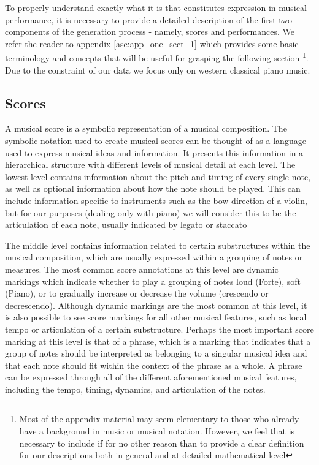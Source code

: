 To properly understand exactly what it is that constitutes expression in musical performance, it is necessary to provide a detailed description of the first two components of the generation process - namely, scores and performances. We refer the reader to appendix \ref{ase:app_one_sect_1} which provides some basic terminology and concepts that will be useful for grasping the following section \footnote{Most of the appendix material may seem elementary to those who already have a background in music or musical notation. However, we feel that is necessary to include if for no other reason than to provide a clear definition for our descriptions both in general and at detailed mathematical level}. Due to the constraint of our data  we focus only on western classical piano music. 

\subsection{Scores}
A musical score is a symbolic representation of a musical composition. The symbolic notation used to create musical scores can be thought of as a language used to express musical ideas and information.  It presents this information in a hierarchical structure with different levels of musical detail at each level. The lowest level contains information about the pitch and timing of every single note, as well as optional information about how the note should be played. This can include information specific to instruments such as the bow direction of a violin, but for our purposes (dealing only with piano) we will consider this to be the articulation of each note, usually indicated by legato or staccato 

The middle level contains information related to certain substructures within the musical composition, which are usually expressed within a grouping of notes or measures. The most common score annotations at this level are dynamic markings which indicate whether to play a grouping of notes loud (Forte), soft (Piano), or to gradually increase or decrease the volume (crescendo or decrescendo). %
Although dynamic markings are the most common at this level, it is also possible to see score markings for all other musical features, such as local tempo or articulation of a certain substructure. Perhaps the most important score marking at this level is that of a phrase, which is a marking that indicates that a group of notes should be interpreted as belonging to a singular musical idea and that each note should fit within the context of the phrase as a whole. A phrase can be expressed through all of the different aforementioned musical features, including the tempo, timing, dynamics, and articulation of the notes.

